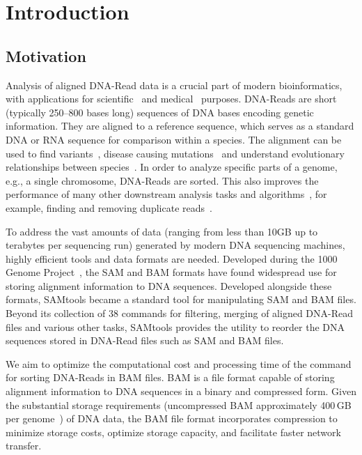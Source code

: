 \section{Introduction}

\subsection{Motivation}
Analysis of aligned DNA-Read data is a crucial part of modern bioinformatics, with applications for scientific~\cite{derrien_fast_2012,kumar_snp_2016,logsdon_long-read_2020} and medical~\cite{lang_identification_2022,chen_personal_2012,yang_transmission_2017} purposes. DNA-Reads are short (typically 250–800 bases long) sequences of DNA bases encoding genetic information. They are aligned to a reference sequence, which serves as a standard DNA or RNA sequence for comparison within a species. The alignment can be used to find variants~\cite{tamura_virological_2023,pabinger_survey_2014,audano_characterizing_2019}, disease causing mutations~\cite{meyerson_advances_2010,he_comprehensive_2021,kim_cross-species_2020} and understand evolutionary relationships between species~\cite{mccormack_applications_2013,sexton_homology-based_2016,branstetter_enriching_2017}. In order to analyze specific parts of a genome, e.g., a single chromosome, DNA-Reads are sorted. This also improves the performance of many other downstream analysis tasks and algorithms~\cite{neph_bedops_2012,li_tabix_2011}, for example, finding and removing duplicate reads~\cite{chen_gencore_2019,noauthor_samtools-markdup1_nodate}. 

To address the vast amounts of data (ranging from less than 10GB up to terabytes per sequencing run) generated by modern DNA sequencing machines, highly efficient tools and data formats are needed. Developed during the 1000 Genome Project~\cite{the_1000_genomes_project_consortium_1000_2012}, the SAM and BAM formats have found widespread use for storing alignment information to DNA sequences. Developed alongside these formats, SAMtools became a standard tool for manipulating SAM and BAM files. Beyond its collection of 38 commands for filtering, merging of aligned DNA-Read files and various other tasks, SAMtools provides the  \sort utility to reorder the DNA sequences stored in DNA-Read files such as SAM and BAM files. 

We aim to optimize the computational cost and processing time of the \sort command for sorting DNA-Reads in BAM files. BAM is a file format capable of storing alignment information to DNA sequences in a binary and compressed form. Given the substantial storage requirements (uncompressed BAM approximately 400\,GB per genome~\cite{noauthor_storage_2011}) of DNA data, the BAM file format incorporates compression to minimize storage costs, optimize storage capacity, and facilitate faster network transfer.

